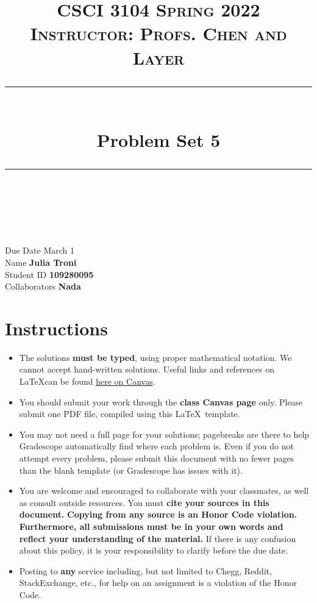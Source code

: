 \documentclass[11pt]{article}
\title{
\normalfont \normalsize 
\textsc{CSCI 3104 Spring 2022 \\ 
Instructor: Profs. Chen and Layer} \\
[10pt] 
\rule{\linewidth}{0.5pt} \\[6pt] 
\huge Problem Set 5 \\
\rule{\linewidth}{2pt}  \\[10pt]
}
\date{}
\theoremstyle{definition}
\theoremstyle{definition}
\theoremstyle{definition}
\begin{document}
\maketitle


\noindent
Due Date \dotfill March 1 \\
Name \dotfill \textbf{Julia Troni} \\
Student ID \dotfill \textbf{109280095} \\
Collaborators \dotfill \textbf{Nada}

\tableofcontents

\section*{Instructions}
 \begin{itemize}
	\item The solutions \textbf{must be typed}, using proper mathematical notation. We cannot accept hand-written solutions. Useful links and references on \LaTeX can be found \href{https://canvas.colorado.edu/courses/75824/pages/latex}{here on Canvas}.
	\item You should submit your work through the \textbf{class Canvas page} only. Please submit one PDF file, compiled using this \LaTeX \ template.
	\item You may not need a full page for your solutions; pagebreaks are there to help Gradescope automatically find where each problem is. Even if you do not attempt every problem, please submit this document with no fewer pages than the blank template (or Gradescope has issues with it).

	\item You are welcome and encouraged to collaborate with your classmates, as well as consult outside resources. You must \textbf{cite your sources in this document.} \textbf{Copying from any source is an Honor Code violation. Furthermore, all submissions must be in your own words and reflect your understanding of the material.} If there is any confusion about this policy, it is your responsibility to clarify before the due date. 

	\item Posting to \textbf{any} service including, but not limited to Chegg, Reddit, StackExchange, etc., for help on an assignment is a violation of the Honor Code.

\end{itemize}
\end{document}
